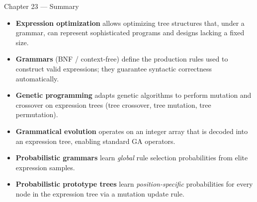 \documentclass[aspectratio=169,10pt]{beamer}
\begin{document}
\begin{frame}{Chapter 23 --- Summary}
  \begin{itemize}
    \item \textbf{Expression optimization} allows optimizing tree structures
      that, under a grammar, can represent sophisticated programs and designs
      lacking a fixed size.
    \medskip
    \item \textbf{Grammars} (BNF / context-free) define the production rules
      used to construct valid expressions; they guarantee syntactic correctness
      automatically.
    \medskip
    \item \textbf{Genetic programming} adapts genetic algorithms to perform
      mutation and crossover on expression trees (tree crossover, tree mutation,
      tree permutation).
    \medskip
    \item \textbf{Grammatical evolution} operates on an integer array that is
      decoded into an expression tree, enabling standard GA operators.
    \medskip
    \item \textbf{Probabilistic grammars} learn \emph{global} rule selection
      probabilities from elite expression samples.
    \medskip
    \item \textbf{Probabilistic prototype trees} learn \emph{position-specific}
      probabilities for every node in the expression tree via a mutation update rule.
  \end{itemize}
\end{frame}
\end{document}
